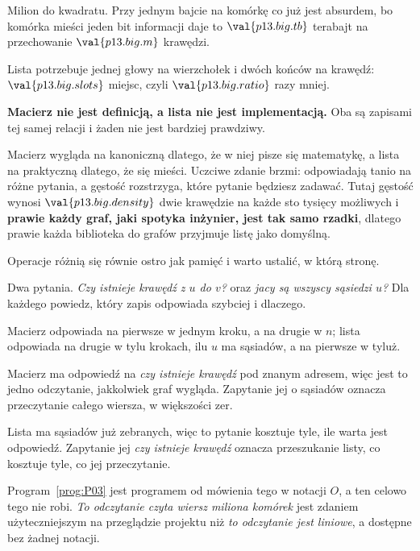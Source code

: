 \begin{fr}
Milion do kwadratu. Przy jednym bajcie na komórkę \dash{} co już jest
absurdem, bo komórka mieści jeden bit informacji \dash{} daje to
$\val{p13.big.tb}$ terabajt na przechowanie $\val{p13.big.m}$ krawędzi.

Lista potrzebuje jednej głowy na wierzchołek i dwóch końców na krawędź:
$\val{p13.big.slots}$ miejsc, czyli $\val{p13.big.ratio}$ razy mniej.

\begin{trapbox}
\textbf{Macierz nie jest definicją, a lista nie jest implementacją.} Oba są
zapisami tej samej relacji i żaden nie jest bardziej prawdziwy.

Macierz wygląda na kanoniczną dlatego, że w niej pisze się matematykę, a lista
na praktyczną dlatego, że się mieści. Uczciwe zdanie brzmi: odpowiadają tanio
na różne pytania, a gęstość rozstrzyga, które pytanie będziesz zadawać. Tutaj
gęstość wynosi $\val{p13.big.density}$ \dash{} dwie krawędzie na każde sto
tysięcy możliwych \dash{} i \textbf{prawie każdy graf, jaki spotyka inżynier,
jest tak samo rzadki}, dlatego prawie każda biblioteka do grafów przyjmuje
listę jako domyślną.
\end{trapbox}
\end{fr}

\begin{fr}
Operacje różnią się równie ostro jak pamięć i warto ustalić, w którą stronę.

Dwa pytania. \emph{Czy istnieje krawędź z $u$ do $v$?} oraz \emph{jacy są
wszyscy sąsiedzi $u$?} Dla każdego powiedz, który zapis odpowiada szybciej i
dlaczego.
\dotline
\nextframe
\end{fr}

\begin{fr}
\begin{ansblock}
Macierz odpowiada na pierwsze w jednym kroku, a na drugie w $n$; lista
odpowiada na drugie w tylu krokach, ilu $u$ ma sąsiadów, a na pierwsze w
tyluż.
\end{ansblock}

Macierz ma odpowiedź na \emph{czy istnieje krawędź} pod znanym adresem, więc
jest to jedno odczytanie, jakkolwiek graf wygląda. Zapytanie jej o sąsiadów
oznacza przeczytanie całego wiersza, w większości zer.

Lista ma sąsiadów już zebranych, więc to pytanie kosztuje tyle, ile warta jest
odpowiedź. Zapytanie jej \emph{czy istnieje krawędź} oznacza przeszukanie
listy, co kosztuje tyle, co jej przeczytanie.

\begin{note}
Program~\ref{prog:P03} jest programem od mówienia tego w notacji $O$, a ten
celowo tego nie robi. \emph{To odczytanie czyta wiersz miliona komórek} jest
zdaniem użyteczniejszym na przeglądzie projektu niż \emph{to odczytanie jest
liniowe}, a dostępne bez żadnej notacji.
\end{note}
\end{fr}

